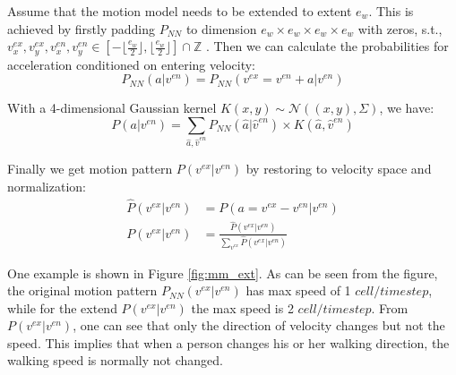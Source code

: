 Assume that the motion model needs to be extended to extent $e_w$. This is achieved by firstly padding $P_{NN}$ to dimension $e_w \times e_w \times e_w \times e_w$ with zeros, s.t., $v^{ex}_x, v^{ex}_y,v^{en}_x, v^{en}_y \in [-\lfloor \frac{e_w}{2} \rfloor, \lfloor \frac{e_w}{2} \rfloor] \cap \mathbb{Z}$ . Then we can calculate the probabilities for acceleration conditioned on entering velocity:
\begin{equation}
P_{NN}(a|v^{en}) = P_{NN}(v^{ex}=v^{en}+a|v^{en}) \label{eq:mm_2}
\end{equation}

With a 4-dimensional Gaussian kernel $K(x, y) \sim \mathcal{N}((x,y), \Sigma)$, we have:
\begin{equation}
P(a|v^{en}) = \sum_{\hat{a}, \hat{v}^{en}}P_{NN}(\hat{a}|\hat{v}^{en})\times K(\hat{a}, \hat{v}^{en}) \label{eq:mm_3} 
\end{equation}

Finally we get motion pattern $P(v^{ex}|v^{en})$ by restoring to velocity space and normalization:
\begin{align}
\hat{P}(v^{ex}|v^{en}) &= P(a=v^{ex}-v^{en}|v^{en}) \\
P(v^{ex}|v^{en}) &= \frac{\hat{P}(v^{ex}|v^{en})}{\sum_{v^{ex}}\hat{P}(v^{ex}|v^{en})} \label{eq:mm_4}
\end{align}

One example is shown in Figure \ref{fig:mm_ext}. As can be seen from the figure, the original motion pattern $P_{NN}(v^{ex}|v^{en})$ has max speed of 1 $cell/timestep$, while for the extend $P(v^{ex}|v^{en})$ the max speed is 2 $cell/timestep$. From $P(v^{ex}|v^{en})$, one can see that only the direction of velocity changes but not the speed. This implies that when a person changes his or her walking direction, the walking speed is normally not changed.

